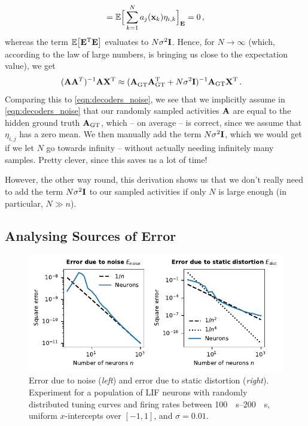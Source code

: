 \documentclass[10pt,letterpaper,oneside]{article}
\begin{document}
{\begin{align*}
		= \mathbb{E}\Big[ \sum_{k = 1}^N a_j({\mathbf{x}}_k) \eta_{i, k} \Big]_{{\mathbf{E}}}
		= 0 \,,
\end{align*}
whereas the term $\mathbb{E}\big[ {\mathbf{E}}^{\mathrm{T}} {\mathbf{E}} \big]$ evaluates to $N \sigma^2 {\mathbf{I}}$. Hence, for $N \to \infty$ (which, according to the law of large numbers, is bringing us close to the expectation value), we get
\begin{align*}
	({\mathbf{A}} {\mathbf{A}}^T)^{-1} {\mathbf{A}} {\mathbf{X}}^{\mathrm{T}}
		&\approx ({\mathbf{A}}^{}_\mathrm{GT} {\mathbf{A}}_\mathrm{GT}^{\mathrm{T}} + N \sigma^2 {\mathbf{I}})^{-1} {\mathbf{A}}_\mathrm{GT} {\mathbf{X}}^{\mathrm{T}} \,.
\end{align*}
Comparing this to \cref{eqn:decoders_noise}, we see that we implicitly assume in \cref{eqn:decoders_noise} that our randomly sampled activities ${\mathbf{A}}$ are equal to the hidden ground truth ${\mathbf{A}}_\mathrm{GT}$, which -- on average -- is correct, since we assume that $\eta_{i,j}$ has a zero mean. We then manually add the term $N \sigma^2 {\mathbf{I}}$, which we would get if we let $N$ go towards infinity -- without actually needing infinitely many samples. Pretty clever, since this saves us a lot of time!

However, the other way round, this derivation shows us that we don't really need to add the term $N \sigma^2 {\mathbf{I}}$ to our sampled activities if only $N$ is large enough (in particular, $N \gg n$).}

\subsection{Analysing Sources of Error}

\begin{figure}
	\centering
	\includegraphics{media/error_experiment.pdf}
	\caption{Error due to noise (\emph{left}) and error due to static distortion (\emph{right}). Experiment for a population of LIF neurons with randomly distributed tuning curves and firing rates between \SIrange{100}{200}{\per\second}, uniform $x$-intercepts over $[-1, 1]$, and $\sigma = 0.01$. }
	\label{fig:error_experiment}
\end{figure}
\end{document}
